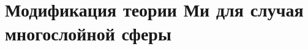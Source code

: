 \def\slantfrac#1#2{ \hspace{3pt}\!^{#1}\!\!\hspace{1pt}/
  \hspace{2pt}\!\!_{#2}\!\hspace{3pt}
} %


\chapter{Модификация теории Ми для случая многослойной сферы} \label{chapt1}
